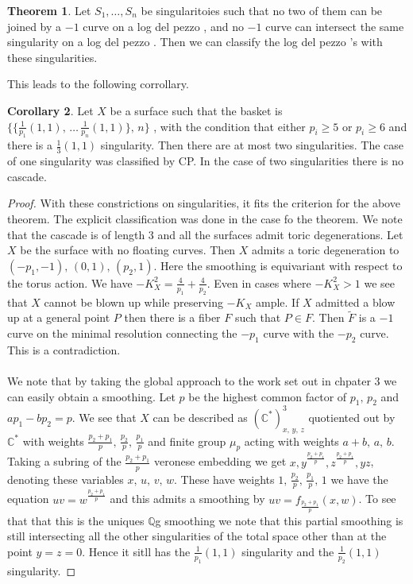 \documentclass[11pt]{report}
\theoremstyle{definition}
\newtheorem{thm}{Theorem}[section]
\theoremstyle{definition}
\newtheorem{cor}[thm]{Corollary}
\theoremstyle{definition}
\theoremstyle{definition}
\theoremstyle{definition}
\theoremstyle{definition}
\theoremstyle{definition}
\theoremstyle{definition}
\newcommand{\C}[1]{(\mathbb{C}^*)^#1}
\newcommand{\ldp}{log del pezzo }
\newcommand{\mb}[1]{\mathbb{#1}}
\begin{document}
\begin{thm}
Let $S_1, \dots , S_n$ be singularitoies such that no two of them can be joined by a $-1$ curve on a \ldp , and no $-1$ curve can intersect the same singularity on a \ldp. Then we can classify the \ldp's with these singularities.
\end{thm}
 This leads to the following corrollary.
\begin{cor}
Let $X$ be a surface such that the basket is  $\{ \{ \frac{1}{p_1}(1,1), \, \dots \, \frac{1}{p_n}(1,1) \}, \, n \}$ , with the condition that either $p_i \geq 5$ or $p_i \geq 6$ and there is a $\frac{1}{3}(1,1)$ singularity. Then there are at most two singularities. The case of one singularity was classified by CP. In the case of two singularities there is no cascade. 
\end{cor}
\begin{proof}
With these constrictions on singularities, it fits the criterion for the above theorem. The explicit classification was done in the case fo the theorem. We note that the cascade is of length 3 and all the surfaces admit toric degenerations. Let $X$ be the surface with no floating curves. Then $X$ admits a toric degeneration to $(-p_1, -1), \, (0, 1), \, (p_2, 1)$. Here the smoothing is equivariant with respect to the torus action. We have $-K_X^2 = \frac{4}{p_1} + \frac{4}{p_2}$. Even in cases where $-K_X^2 > 1$ we see that $X$ cannot be blown up while preserving $-K_X$ ample. If $X$ admitted a blow up at a general point $P$ then there is a fiber $F$ such that $P \in F$. Then $\widetilde F$ is a $-1$ curve on the minimal resolution connecting the $-p_1$ curve with the $-p_2$ curve. This is a contradiction.
\\
\\
We note that by taking the global approach to the work set out in chpater 3 we can easily obtain a smoothing. Let $p$ be the highest common factor of $p_1, \, p_2$ and $ap_1 - bp_2 = p$. We see that $X$ can be described as $\C{3}_{x, \,y, \, z}$ quotiented out by $\mb{C}^*$ with weights $\frac{p_2 + p_1}{p}, \, \frac{p_2}{p}, \, \frac{p_1}{p}$ and finite group $\mu_p$ acting with weights $a+b, \, a, \, b $. Taking a subring of the $\frac{p_2 + p_1}{p}$ veronese embedding we get $x, y^\frac{p_2 + p_1}{p}, z ^\frac{p_2 + p_1}{p}, yz$, denoting these variables $x, \, u, \, v, \, w$. These have weights $1, \, \frac{p_2}{p}, \, \frac{p_1}{p}, \, 1$ we have the equation $uv = w^\frac{p_2 + p_1}{p}$ and this admits a smoothing by $uv = f_\frac{p_2 + p_1}{p} ( x,w)$. To see that that this is the uniques $\mb{Q}$g smoothing we note that this partial smoothing is still intersecting all the other singularities of the total space other than at the point $y = z = 0$. Hence it sitll has the $\frac{1}{p_1}(1,1)$ singularity and the $\frac{1}{p_2}(1,1)$ singularity.
\end{proof}
\end{document}
